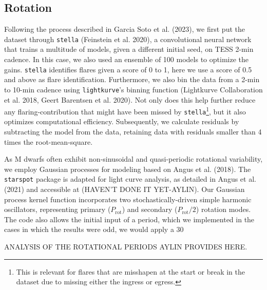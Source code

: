 \subsection{Rotation}
Following the process described in Garcia Soto et al. (2023), we first put the dataset through \texttt{stella} (Feinstein et al. 2020), a convolutional neural network that trains a multitude of models, given a different initial seed, on TESS 2-min cadence. In this case, we also used an ensemble of 100 models to optimize the gains. \texttt{stella} identifies flares given a score of 0 to 1, here we use a score of 0.5 and above as flare identification. Furthermore, we also bin the data from a 2-min to 10-min cadence using \texttt{lightkurve}'s binning function (Lightkurve Collaboration et al. 2018, Geert Barentsen et al. 2020). Not only does this help further reduce any flaring-contribution that might have been missed by \texttt{stella}\footnote{This is relevant for flares that are misshapen at the start or break in the dataset due to missing either the ingress or egress.}, but it also optimizes computational efficiency. Subsequently, we calculate residuals by subtracting the model from the data, retaining data with residuals smaller than 4 times the root-mean-square.

As M dwarfs often exhibit non-sinusoidal and quasi-periodic rotational variability, we employ Gaussian processes for modeling based on Angus et al. (2018). The \texttt{starspot} package is adapted for light curve analysis, as detailed in Angus et al. (2021) and accessible at (HAVEN'T DONE IT YET-AYLIN). Our Gaussian process kernel function incorporates two stochastically-driven simple harmonic oscillators, representing primary ($P_\textrm{rot}$) and secondary ($P_\textrm{rot}/2$) rotation modes. The code also allows the initial input of a period, which we implemented in the cases in which the results were odd, we would apply a 30%


{\color{red} ANALYSIS OF THE ROTATIONAL PERIODS AYLIN PROVIDES HERE.}
